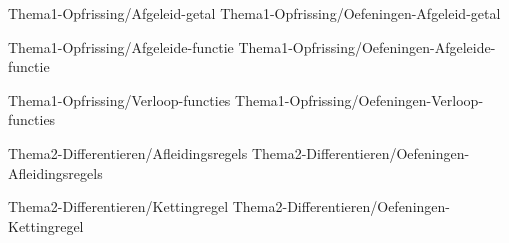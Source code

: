 %


\FVDchapterpair
  {Thema1-Opfrissing/Afgeleid-getal}
  {Thema1-Opfrissing/Oefeningen-Afgeleid-getal}

\FVDchapterpair
  {Thema1-Opfrissing/Afgeleide-functie}
  {Thema1-Opfrissing/Oefeningen-Afgeleide-functie}

\FVDchapterpair
  {Thema1-Opfrissing/Verloop-functies}
  {Thema1-Opfrissing/Oefeningen-Verloop-functies}




  {Thema2-Differentieren/Afleidingsregels}
  {Thema2-Differentieren/Oefeningen-Afleidingsregels}

  {Thema2-Differentieren/Kettingregel}
  {Thema2-Differentieren/Oefeningen-Kettingregel}